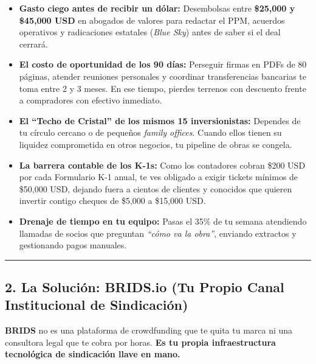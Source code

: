\documentclass[
]{article}
\providecommand{\tightlist}{%
  \setlength{\itemsep}{0pt}\setlength{\parskip}{0pt}}
\begin{document}
\begin{itemize}
\tightlist
\item
  \textbf{Gasto ciego antes de recibir un dólar:} Desembolsas entre
  \textbf{\$25,000 y \$45,000 USD} en abogados de valores para redactar
  el PPM, acuerdos operativos y radicaciones estatales (\emph{Blue Sky})
  antes de saber si el deal cerrará.
\item
  \textbf{El costo de oportunidad de los 90 días:} Perseguir firmas en
  PDFs de 80 páginas, atender reuniones personales y coordinar
  transferencias bancarias te toma entre 2 y 3 meses. En ese tiempo,
  pierdes terrenos con descuento frente a compradores con efectivo
  inmediato.
\item
  \textbf{El ``Techo de Cristal'' de los mismos 15 inversionistas:}
  Dependes de tu círculo cercano o de pequeños \emph{family offices}.
  Cuando ellos tienen su liquidez comprometida en otros negocios, tu
  pipeline de obras se congela.
\item
  \textbf{La barrera contable de los K-1s:} Como los contadores cobran
  \$200 USD por cada Formulario K-1 anual, te ves obligado a exigir
  tickets mínimos de \$50,000 USD, dejando fuera a cientos de clientes y
  conocidos que quieren invertir contigo cheques de \$5,000 a \$15,000
  USD.
\item
  \textbf{Drenaje de tiempo en tu equipo:} Pasas el 35\% de tu semana
  atendiendo llamadas de socios que preguntan \emph{``cómo va la
  obra''}, enviando extractos y gestionando pagos manuales.
\end{itemize}

\begin{center}\rule{0.5\linewidth}{0.5pt}\end{center}

\subsection{2. La Solución: BRIDS.io (Tu Propio Canal Institucional de
Sindicación)}\label{la-soluciuxf3n-brids.io-tu-propio-canal-institucional-de-sindicaciuxf3n}

\textbf{BRIDS} no es una plataforma de crowdfunding que te quita tu
marca ni una consultora legal que te cobra por horas. \textbf{Es tu
propia infraestructura tecnológica de sindicación llave en mano.}
\end{document}
